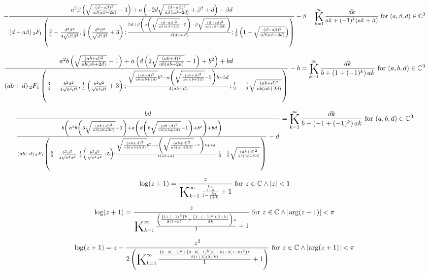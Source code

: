 \documentclass{article}
\newcommand{\bigK}{\mathop{\raisebox{-5pt}{\huge K}}}
\begin{document}
\[-\frac{a^2 \beta  \left(\sqrt{\frac{(d-a \beta )^2}{a \beta  (a \beta -2 d)}}-1\right)+a \left(-2 d \sqrt{\frac{(d-a \beta )^2}{a \beta  (a \beta -2 d)}}+\beta ^2+d\right)-\beta  d}{(d-a \beta ) \, _2F_1\left(\frac{3}{4}-\frac{d^2 \beta ^2}{4 \sqrt{d^4 \beta ^4}},\frac{1}{4} \left(\frac{d^2 \beta ^2}{\sqrt{d^4 \beta ^4}}+3\right);\frac{5 d+\beta  \left(a \left(\sqrt{\frac{(d-a \beta )^2}{a \beta  (a \beta -2 d)}}-5\right)-\beta  \sqrt{\frac{(d-a \beta )^2}{a \beta  (a \beta -2 d)}}\right)}{4 (d-a \beta )};\frac{1}{2} \left(1-\sqrt{\frac{(d-a \beta )^2}{a \beta  (a \beta -2 d)}}\right)\right)}-\beta =\bigK_{k=1}^{\infty}\frac{d k}{a k+(-1)^k (a k+\beta )}\text{ for }(a,\beta ,d)\in \mathbb{C}^3\] 

\[\frac{a^2 b \left(\sqrt{\frac{(a b+d)^2}{a b (a b+2 d)}}-1\right)+a \left(d \left(2 \sqrt{\frac{(a b+d)^2}{a b (a b+2 d)}}-1\right)+b^2\right)+b d}{(a b+d) \, _2F_1\left(\frac{3}{4}-\frac{b^2 d^2}{4 \sqrt{b^4 d^4}},\frac{1}{4} \left(\frac{b^2 d^2}{\sqrt{b^4 d^4}}+3\right);\frac{\sqrt{\frac{(a b+d)^2}{a b (a b+2 d)}} b^2-a \left(\sqrt{\frac{(a b+d)^2}{a b (a b+2 d)}}-5\right) b+5 d}{4 (a b+d)};\frac{1}{2}-\frac{1}{2} \sqrt{\frac{(a b+d)^2}{a b (a b+2 d)}}\right)}-b=\bigK_{k=1}^{\infty}\frac{d k}{b+\left(1+(-1)^k\right) a k}\text{ for }(a,b,d)\in \mathbb{C}^3\] 

\[\frac{b d}{\frac{b \left(a^2 b \left(3 \sqrt{\frac{(a b+d)^2}{a b (a b+2 d)}}-1\right)+a \left(d \left(6 \sqrt{\frac{(a b+d)^2}{a b (a b+2 d)}}-1\right)+b^2\right)+b d\right)}{(a b+d) \, _2F_1\left(\frac{5}{4}-\frac{b^2 d^2}{4 \sqrt{b^4 d^4}},\frac{1}{4} \left(\frac{b^2 d^2}{\sqrt{b^4 d^4}}+5\right);\frac{\sqrt{\frac{(a b+d)^2}{a b (a b+2 d)}} b^2-a \left(\sqrt{\frac{(a b+d)^2}{a b (a b+2 d)}}-7\right) b+7 d}{4 (a b+d)};\frac{1}{2}-\frac{1}{2} \sqrt{\frac{(a b+d)^2}{a b (a b+2 d)}}\right)}-d}=\bigK_{k=1}^{\infty}\frac{d k}{b-\left(-1+(-1)^k\right) a k}\text{ for }(a,b,d)\in \mathbb{C}^3\] 

\[\log (z+1)=\frac{z}{\bigK_{k=1}^{\infty}\frac{\frac{k z}{1+k}}{1-\frac{k z}{1+k}}+1}\text{ for }z\in \mathbb{C}\land \left| z\right| <1\] 

\[\log (z+1)=\frac{z}{\bigK_{k=1}^{\infty}\frac{\left(\frac{\left(1+(-1)^k\right) k}{8 (1+k)}+\frac{\left(1-(-1)^k\right) (1+k)}{8 k}\right) z}{1}+1}\text{ for }z\in \mathbb{C}\land \left| \arg (z+1)\right| <\pi\] 

\[\log (z+1)=z-\frac{z^2}{2 \left(\bigK_{k=1}^{\infty}\frac{\frac{\left(5-3 (-1)^k+\left(2-6 (-1)^k\right) (1+k)+2 (1+k)^2\right) z}{8 (1+k) (2+k)}}{1}+1\right)}\text{ for }z\in \mathbb{C}\land \left| \arg (z+1)\right| <\pi\] 
\end{document}
